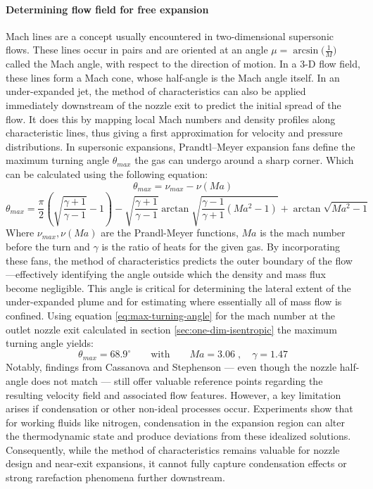 	\paragraph*{Determining flow field for free expansion}
		Mach lines are a concept usually encountered in two-dimensional supersonic flows. 
		These lines occur in pairs and are oriented at an angle $\mu = \arcsin\!\bigl(\frac{1}{M}\bigr)$ called the Mach angle, with respect to the direction of motion.
		In a 3-D flow field, these lines form a Mach cone, whose half-angle is the Mach angle itself.
		In an under-expanded jet, the method of characteristics can also be applied immediately downstream of the nozzle exit to predict the initial spread of the flow.
		It does this by mapping local Mach numbers and density profiles along characteristic lines, thus giving 
		a first approximation for velocity and pressure distributions.
		In supersonic expansions, Prandtl–Meyer expansion fans define the maximum turning angle $\theta_{max}$ the gas can undergo around a sharp corner.
		Which can be calculated using the following equation:
		\begin{equation*}
			\theta_{max} = \nu_{max} - \nu(Ma)
		\end{equation*}
		\begin{equation}
			\theta_{max} = \frac{\pi}{2} \left(\sqrt{\frac{\gamma + 1}{\gamma - 1}} - 1\right) - \sqrt{\frac{\gamma + 1}{\gamma - 1}}\arctan{\sqrt{\frac{\gamma - 1}{\gamma + 1}(Ma^2 - 1)}} + \arctan{\sqrt{Ma^2 -1}}
			\label{eq:max-turning-angle}
		\end{equation}
		Where $\nu_{max},\nu(Ma)$ are the Prandl-Meyer functions, $Ma$ is the mach number before the turn and $\gamma$ is the ratio of heats for the given gas.
		By incorporating these fans, the method of characteristics predicts the outer boundary of the flow—effectively identifying the angle outside which the density and mass flux become negligible.
		This angle is critical for determining the lateral extent of the under-expanded plume and for estimating where essentially all of mass flow is confined.
		Using equation \eqref{eq:max-turning-angle} for the mach number at the outlet nozzle exit calculated in section \ref{sec:one-dim-isentropic} the maximum turning angle yields:
		$$
			\theta_{max} = 68.9^\circ
			\qquad \text{with} \qquad
			Ma = 3.06\;,\quad \gamma = 1.47
		$$
		Notably, findings from Cassanova and Stephenson \cite{Cassanova1965} — even though the nozzle half-angle does not match — still offer valuable reference points regarding the resulting velocity field and associated flow features.
		However, a key limitation arises if condensation or other non-ideal processes occur.
		Experiments show that for working fluids like nitrogen, condensation in the expansion region can alter the thermodynamic state and produce deviations from these idealized solutions.
		Consequently, while the method of characteristics remains valuable for nozzle design and near-exit expansions, it cannot fully capture condensation effects or strong rarefaction phenomena further downstream.
		\cite{jousten_handbook_2016, robertson_investigation_1970, noauthor_zucrow_nodate}

